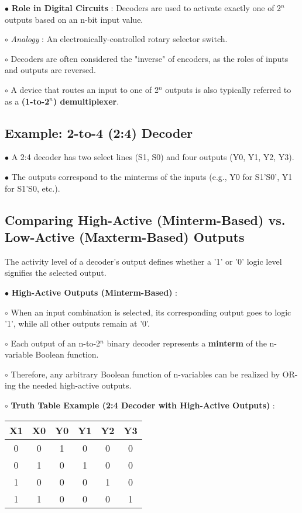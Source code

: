 \documentclass{article}
\begin{document}
\begin{itemize}
$\bullet$ \textbf{Role in Digital Circuits} : Decoders are used to activate exactly one of 2$^{n}$ outputs based on an n-bit input value.

    $\circ$ \textit{Analogy} : An electronically-controlled rotary selector switch.

    $\circ$ Decoders are often considered the "inverse" of encoders, as the roles of inputs and outputs are reversed.

    $\circ$ A device that routes an input to one of 2$^{n}$ outputs is also typically referred to as a \textbf{(1-to-2$^{n}$) demultiplexer}.

\subsection{Example: 2-to-4 (2:4) Decoder}

$\bullet$ A 2:4 decoder has two select lines (S1, S0) and four outputs (Y0, Y1, Y2, Y3).

$\bullet$ The outputs correspond to the minterms of the inputs (e.g., Y0 for S1'S0', Y1 for S1'S0, etc.).

\subsection{Comparing High-Active (Minterm-Based) vs. Low-Active (Maxterm-Based) Outputs}

The activity level of a decoder's output defines whether a '1' or '0' logic level signifies the selected output.

$\bullet$ \textbf{High-Active Outputs (Minterm-Based)} :

    $\circ$ When an input combination is selected, its corresponding output goes to logic '1', while all other outputs remain at '0'.

    $\circ$ Each output of an n-to-2$^{n}$ binary decoder represents a \textbf{minterm} of the n-variable Boolean function.

    $\circ$ Therefore, any arbitrary Boolean function of n-variables can be realized by OR-ing the needed high-active outputs.

    $\circ$ \textbf{Truth Table Example (2:4 Decoder with High-Active Outputs)} : 
    \begin{tabular}{c c | c c c c}
    \toprule
     X1 & X0 & Y0 & Y1 & Y2 & Y3 \\
    \midrule
     0 & 0 & 1 & 0 & 0 & 0 \\
     0 & 1 & 0 & 1 & 0 & 0 \\
     1 & 0 & 0 & 0 & 1 & 0 \\
     1 & 1 & 0 & 0 & 0 & 1 \\
    \bottomrule
    


\end{tabular}
\end{itemize}
\end{document}
